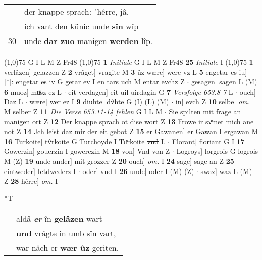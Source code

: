 \documentclass[8pt,a4paper,notitlepage]{article}
\begin{document}
\begin{table}[ht]
\begin{minipage}[t]{0.5\linewidth}
\begin{tabular}{rl}
 & der knappe sprach: "hêrre, jâ.\\ 
 & ich vant den künic unde \textbf{sîn} wîp\\ 
30 & unde \textbf{dar zuo} manigen \textbf{werden} lîp.\\ 
\end{tabular}
\scriptsize
\line(1,0){75} \newline
G I L M Z Fr48 \newline
\line(1,0){75} \newline
\textbf{1} \textit{Initiale} G I L M Z Fr48  \textbf{25} \textit{Initiale} I  \newline
\line(1,0){75} \newline
\textbf{1} verlâzen] gelazzen Z \textbf{2} vrâget] vragite M \textbf{3} ûz wære] were vz L \textbf{5} engetar es iu] [*]: engetar es iv G getar ev I en tars uch M entar evchz Z  $\cdot$ gesagen] sagen L (M) \textbf{6} muoz] muͯsz ez L  $\cdot$ eit verdagen] eit uil uirdagin G \textbf{7} \textit{Versfolge 653.8-7} L   $\cdot$ ouch] Daz L  $\cdot$ wære] wer ez I \textbf{9} diuhte] dv̂hte G (I) (L) (M)  $\cdot$ in] evch Z \textbf{10} selbe] \textit{om.} M selber Z \textbf{11} \textit{Die Verse 653.11-14 fehlen} G I L M   $\cdot$ Sie spilten mit frage an manigen ort Z \textbf{12} Der knappe sprach ot dise wort Z \textbf{13} Frowe ir svͤmet mich ane not Z \textbf{14} Jch leist daz mir der eit gebot Z \textbf{15} er Gawanen] er Gawan I ergawan M \textbf{16} Turkoite] tv̂rkoite G Turchoyde I Tuͯrkoite \sout{vnd} L  $\cdot$ Florant] floriant G I \textbf{17} Gowerzin] gouerzin I gowerczin M \textbf{18} von] Vnd von Z  $\cdot$ Logroys] lorgrois G logrois M (Z) \textbf{19} unde ander] mit grozzer Z \textbf{20} ouch] \textit{om.} I \textbf{24} sage] sage an Z \textbf{25} eintweder] Ietdwederz I  $\cdot$ oder] vnd I \textbf{26} unde] oder I (M) (Z)  $\cdot$ swaz] waz L (M) Z \textbf{28} hêrre] \textit{om.} I \newline
\end{minipage}
\hspace{0.5cm}
\begin{minipage}[t]{0.5\linewidth}
\small
\begin{center}*T
\end{center}
\begin{tabular}{rl}
 & aldâ \textit{\textbf{er}} în \textbf{gelâzen} wart\\ 
 & \textbf{und} vrâgte in umb sîn vart,\\ 
 & war nâch er \textbf{wær ûz} geriten.\\ 

\end{tabular}
\end{minipage}
\end{table}
\end{document}
